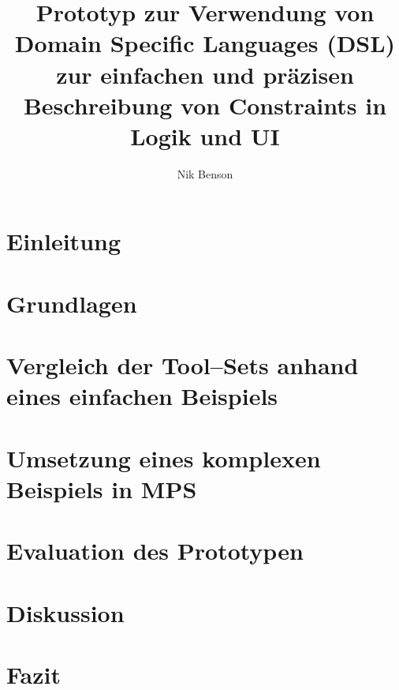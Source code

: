 \documentclass[12pt]{article}
\title{Prototyp zur Verwendung von Domain Specific Languages (DSL) zur einfachen und präzisen Beschreibung von Constraints in Logik und UI}
\author{Nik Benson}
\affil{\href{mailto:nik.benson@studmail.w-hs.de}{nik.benson@studmail.w-hs.de}}
\begin{document}
    

    



    \section{Einleitung}\label{sec:einleitung}
    


    \section{Grundlagen}\label{sec:grundlagen}
    


    \section{Vergleich der Tool--Sets anhand eines einfachen Beispiels}\label{sec:vergleich-der-tool-sets-anhand-eines-einfachen-beispiels}
    


    \section{Umsetzung eines komplexen Beispiels in \acs{MPS}}\label{sec:umsetzung-eines-komplexen-beispiels-in-mps}
    


    \section{Evaluation des Prototypen}\label{sec:evaluation-des-prototypen}
    


    \section{Diskussion}\label{sec:diskussion}
    


    \section{Fazit}\label{sec:fazit}
    

    

    
\end{document}
